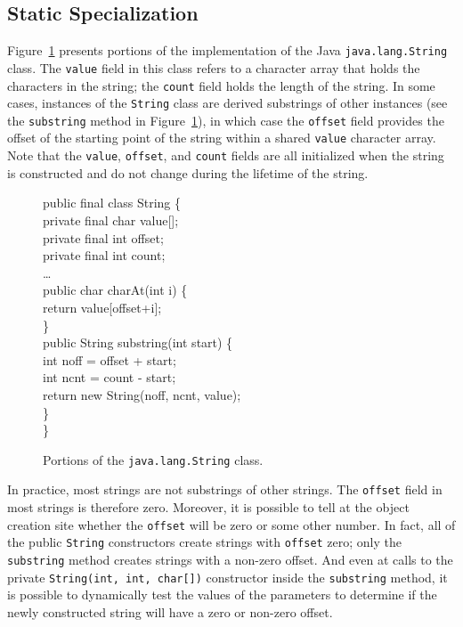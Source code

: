 \documentclass{acmconf}
\begin{document}
\subsection{Static Specialization} 

Figure~\ref{fig:string-fields} presents portions of the implementation
of the Java {\tt java.lang.String} class. The {\tt value} field in this
class refers to a character array that holds the characters
in the string; the {\tt count} field holds the length of the
string. In some cases, instances of the {\tt String} class
are derived substrings of other instances 
(see the {\tt substring} method in Figure~\ref{fig:string-fields}), in
which case the
{\tt offset} field provides the offset of the starting 
point of the string within a shared {\tt value} character array. 
Note that the {\tt value}, {\tt offset}, and {\tt count} 
fields are all initialized when the string is constructed
and do not change during the lifetime of the string.

\begin{figure}[tp]
\begin{samplecode}
public final class String \{\\
\>private final char value[];\\
\>private final int offset;\\
\>private final int count;\\
\>\ldots\\
\>public char charAt(int i) \{\\
\>\>return value[offset+i];\\
\>\}\\
\>public String substring(int start) \{\\
\>\>int noff = offset + start;\\
\>\>int ncnt = count - start;\\
\>\>return new String(noff, ncnt, value);\\
\>\}\\
\}\\
\end{samplecode}
\caption{Portions of the {\tt java.lang.String} class.}
\label{fig:string-fields}
\end{figure}

In practice, most strings are not substrings of other strings. 
The {\tt offset} field in most strings is therefore zero.
Moreover, it is possible to tell at the object creation site
whether the {\tt offset} will be zero or some other number.
In fact, all of the public {\tt String} constructors create
strings with {\tt offset} zero; only the {\tt substring} method
creates strings with a non-zero offset. And even at 
calls to the private {\tt String(int, int, char[])} constructor
inside the {\tt substring} method, it is possible to dynamically
test the values of the parameters to determine if the newly
constructed string will have a zero or non-zero offset.
\end{document}
